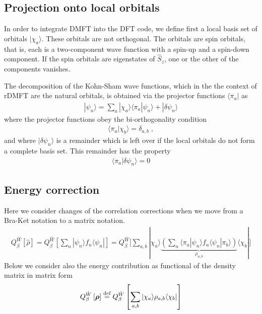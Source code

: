\documentclass[11pt,a4paper]{report}
\begin{document}
\subsection{Projection onto local orbitals}
In order to integrate DMFT into the DFT code, we define first a local
basis set of orbitals $|\chi_a\rangle$. These orbitals are not
orthogonal. The orbitals are spin orbitals, that is, each is a
two-component wave function with a spin-up and a spin-down
component. If the spin orbitals are eigenstates of $\hat{S}_z$, one or
the other of the components vanishes.

The decomposition of the Kohn-Sham wave functions,
which in the the context of rDMFT are the natural orbitals, is
obtained via the projector functions $\langle\pi_a|$ as
\begin{eqnarray}
|\psi_n\rangle=\sum_a|\chi_a\rangle\langle\pi_a|\psi_n\rangle
+|\delta\psi_n\rangle
\end{eqnarray}
where the projector functions obey the bi-orthogonality condition
\begin{eqnarray}
\langle\pi_a|\chi_b\rangle=\delta_{a,b}\;,
\end{eqnarray}
and where $|\delta\psi_n\rangle$ is a remainder which is left over if the
local orbitals do not form a complete basis set. This remainder has
the property
\begin{eqnarray}
\langle\pi_a|\delta\psi_n\rangle=0
\end{eqnarray}

\subsection{Energy correction}
Here we consider changes of the correlation corrections when we move
from a Bra-Ket notation to a matrix notation.
\begin{eqnarray}
Q_\beta^{\hat{W}}\left[\hat{\rho}\right]
=Q_\beta^{\hat{W}}\left[\sum_n|\psi_n\rangle f_n\langle\psi_n|\right]
=
Q_\beta^{\hat{W}}\biggl[\sum_{a,b}|\chi_a\rangle
\underbrace{\left(
\sum_n\langle\pi_a|\psi_n\rangle f_n\langle\psi_n|\pi_b\rangle
\right)}_{\rho_{a,b}}\langle\chi_b|
\biggr]
\end{eqnarray}
Below we consider also the energy contribution as functional of the
density matrix in matrix form
\begin{eqnarray}
Q_\beta^{\hat{W}}\left[\bm{\rho}\right]\stackrel{\text{def}}{=}
Q_\beta^{\hat{W}}\left[\sum_{a,b}|\chi_a\rangle\rho_{a,b}\langle\chi_b|\right]
\end{eqnarray}
\end{document}
